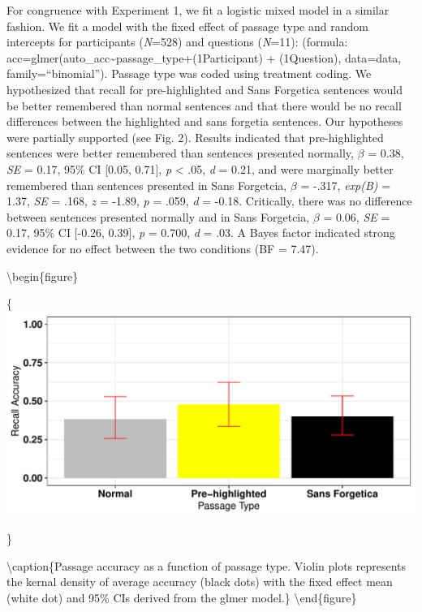 \documentclass[english,pdf]{apa6}
\begin{document}
For congruence with Experiment 1, we fit a logistic mixed model in a similar fashion. We fit a model with the fixed effect of passage type and random intercepts for participants (\emph{N}=528) and questions (\emph{N}=11): (formula: acc=glmer(auto\_acc\textasciitilde{}passage\_type+(1\textbar{}Participant) + (1\textbar{}Question), data=data, family=\enquote{binomial}). Passage type was coded using treatment coding. We hypothesized that recall for pre-highlighted and Sans Forgetica sentences would be better remembered than normal sentences and that there would be no recall differences between the highlighted and sans forgetia sentences. Our hypotheses were partially supported (see Fig. 2). Results indicated that pre-highlighted sentences were better remembered than sentences presented normally, \(\beta\) = 0.38, \emph{SE} = 0.17, 95\% CI {[}0.05, 0.71{]}, \emph{p} \textless{} .05, \emph{d} = 0.21, and were marginally better remembered than sentences presented in Sans Forgetcia, \(\beta\) = -.317, \emph{exp(B)} = 1.37, \emph{SE} = .168, \emph{z} = -1.89, \emph{p} = .059, \emph{d} = -0.18. Critically, there was no difference between sentences presented normally and in Sans Forgetcia, \(\beta\) = 0.06, \emph{SE} = 0.17, 95\% CI {[}-0.26, 0.39{]}, \emph{p} = 0.700, \emph{d} = .03. A Bayes factor indicated strong evidence for no effect between the two conditions (BF = 7.47).

\textbackslash{}begin\{figure\}

\{\centering \includegraphics{SF_Paper_files/figure-latex/unnamed-chunk-3-1}

\}

\textbackslash{}caption\{Passage accuracy as a function of passage type. Violin plots represents the kernal density of average accuracy (black dots) with the fixed effect mean (white dot) and 95\% CIs derived from the glmer model.\}\label{fig:unnamed-chunk-3}
\textbackslash{}end\{figure\}
\end{document}
